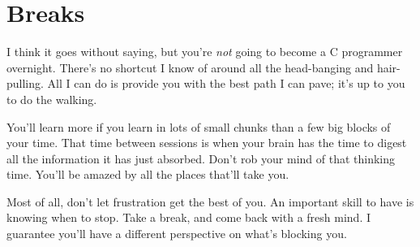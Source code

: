\section{Breaks}

I think it goes without saying, but you're \emph{not} going to become a
C programmer overnight.  There's no shortcut I know of around all the
head-banging and hair-pulling.  All I can do is provide you with the
best path I can pave; it's up to you to do the walking.

You'll learn more if you learn in lots of small chunks than a few big
blocks of your time.  That time between sessions is when your brain has
the time to digest all the information it has just absorbed.  Don't rob
your mind of that thinking time.  You'll be amazed by all the places
that'll take you.

Most of all, don't let frustration get the best of you.  An important
skill to have is knowing when to stop.  Take a break, and come back with
a fresh mind.  I guarantee you'll have a different perspective on what's
blocking you.
